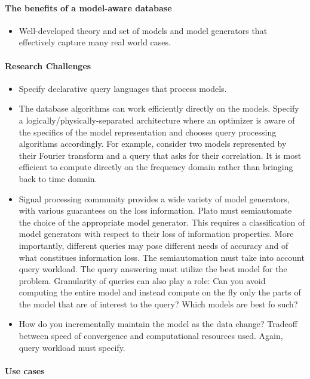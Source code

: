 \paragraph{The benefits of a model-aware database}

\begin{itemize}
%
\item Well-developed theory and set of models and model generators that effectively capture many real world cases.
%
\end{itemize}

\paragraph{Research Challenges}
\begin{itemize}
%
\item Specify declarative query languages that process models.
%
\item The database algorithms can work efficiently directly on the models. Specify a logically/physically-separated architecture where an optimizer is aware of the specifics of the model representation and chooses query processing algorithms accordingly.  For example, consider two models represented by their Fourier transform and a query that asks for their correlation. It is most efficient to compute directly on the frequency domain rather than bringing back to time domain.
%
\item Signal processing community provides a wide variety of model generators, with various guarantees on the loss information. Plato must semiautomate the choice of the appropriate model generator. This requires a classification of model generators with respect to their loss of information properties. More importantly, different queries may pose different needs of accuracy and of what constitues information loss. The semiautomation must take into account query workload. The query answering must utilize the best model for the problem. Granularity of queries can also play a role: Can you avoid computing the entire model and instead compute on the fly only the parts of the model that are of interest to the query? Which models are best fo such?
%
\item How do you incrementally maintain the model as the data change? Tradeoff between speed of convergence and computational resources used. Again, query workload must specify.
\end{itemize}

\paragraph{Use cases}

